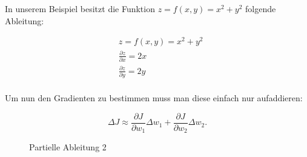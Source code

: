 In unserem Beispiel besitzt die Funktion ${ z = f(x, y) = x^2 + y^2 }$ folgende Ableitung: 

\begin{equation}
\begin{aligned}
& z = f(x, y) = x^2 + y^2 \\
& \frac{\partial z}{\partial x} = 2x \\
& \frac{\partial z}{\partial y} = 2y \\
\end{aligned}
\end{equation}

Um nun den Gradienten zu bestimmen muss man diese einfach nur aufaddieren: 

\begin{equation}
  \Delta J \approx \frac{\partial J}{\partial w_1} \Delta w_1 +
  \frac{\partial J}{\partial w_2} \Delta w_2.
\end{equation}

\begin{figure}%
  \centering
  \qquad
  \caption{Partielle Ableitung 2}
  \label{fig:partAbl2}
\end{figure}


